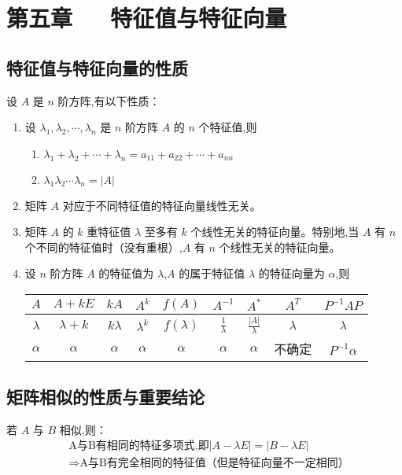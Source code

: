 \documentclass[UTF8]{ctexart}
\theoremstyle{remark}
\begin{document}
	\section{第五章~~~特征值与特征向量}
	\subsection{特征值与特征向量的性质}
	设 \(A\) 是 \(n\) 阶方阵,有以下性质：
	\begin{enumerate}
		\item 设 \(\lambda_1, \lambda_2, \cdots, \lambda_n\) 是 \(n\) 阶方阵 \(A\) 的 \(n\) 个特征值,则
		\begin{enumerate}
			\item \(\lambda_1 + \lambda_2 + \cdots + \lambda_n = a_{11} + a_{22} + \cdots + a_{nn}\)
			\item \(\lambda_1\lambda_2\cdots\lambda_n = |A|\)
		\end{enumerate}
		\item 矩阵 \(A\) 对应于不同特征值的特征向量线性无关。
		\item 矩阵 \(A\) 的 \(k\) 重特征值 \(\lambda\) 至多有 \(k\) 个线性无关的特征向量。特别地,当 \(A\) 有 \(n\) 个不同的特征值时（没有重根）,\(A\) 有 \(n\) 个线性无关的特征向量。
		\item 设 \(n\) 阶方阵 \(A\) 的特征值为 \(\lambda\),\(A\) 的属于特征值 \(\lambda\) 的特征向量为 \(\alpha\),则
		\begin{table}[h]
			\centering
			\begin{tabular}{|c|c|c|c|c|c|c|c|c|}
				\hline
				\(A\) & \(A + kE\) & \(kA\) & \(A^k\) & \(f(A)\) & \(A^{-1}\) & \(A^*\) & \(A^T\) & \(P^{-1}AP\) \\
				\hline
				\(\lambda\) & \(\lambda + k\) & \(k\lambda\) & \(\lambda^k\) & \(f(\lambda)\) & \(\frac{1}{\lambda}\) & \(\frac{|A|}{\lambda}\) & \(\lambda\) & \(\lambda\) \\
				\hline
				\(\alpha\) & \(\alpha\) & \(\alpha\) & \(\alpha\) & \(\alpha\) & \(\alpha\) & \(\alpha\) & 不确定 & \(P^{-1}\alpha\) \\
				\hline
			\end{tabular}
		\end{table}
	\end{enumerate}
	
	\subsection{矩阵相似的性质与重要结论}
	若 \(A\) 与 \(B\) 相似,则：
	\begin{align*}
		&\text{A与B有相同的特征多项式,即}|A - \lambda E| = |B - \lambda E|\\
		&\Rightarrow \text{A与B有完全相同的特征值（但是特征向量不一定相同）}
	\end{align*}
	
\end{document}
